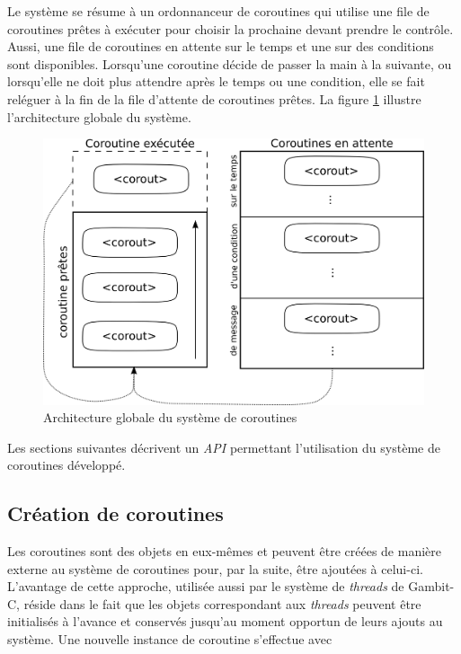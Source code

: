 \documentclass[12pt,twoside,letterpaper,francais]{book}
\begin{document}
Le système se résume à un ordonnanceur de coroutines qui utilise une
file de coroutines prêtes à exécuter pour choisir la prochaine devant
prendre le contrôle. Aussi, une file de coroutines en attente sur le
temps et une sur des conditions sont disponibles. Lorsqu'une coroutine
décide de passer la main à la suivante, ou lorsqu'elle ne doit plus
attendre après le temps ou une condition, elle se fait reléguer à la
fin de la file d'attente de coroutines prêtes. La figure
\ref{Corout:system-schema} illustre l'architecture globale du système.\\

\begin{figure}[htb!]
  \center
  \includegraphics[scale=0.7]{corout-system}
  \caption{Architecture globale du système de coroutines}
  \label{Corout:system-schema}
\end{figure}

 Les sections suivantes décrivent un \textit{API} permettant
l'utilisation du système de coroutines développé.


\FloatBarrier
\subsection{Création de coroutines}
Les coroutines sont des objets en eux-mêmes et peuvent être créées de
manière externe au système de coroutines pour, par la suite, être
ajoutées à celui-ci. L'avantage de cette approche, utilisée aussi par
le système de \textit{threads} de Gambit-C, réside dans le fait que
les objets correspondant aux \textit{threads} peuvent être initialisés
à l'avance et conservés jusqu'au moment opportun de leurs ajouts au
système. Une nouvelle instance de coroutine s'effectue avec
\end{document}
